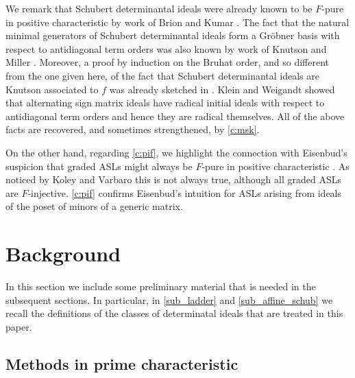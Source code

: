 \documentclass[12pt]{amsart}
\theoremstyle{definition}
\renewcommand{\(}{\left(}
\renewcommand{\)}{\right)}
\renewcommand{\!}[1]{{\color{red}\text{\Huge$\star$ }#1}}
\begin{document}
We remark that Schubert determinantal ideals %
were already known to be  %
$F$-pure in positive characteristic by work of Brion and Kumar  \cite{Brion_Kumar_Book}. The fact that the natural minimal generators of Schubert determinantal ideals form a Gr\"obner basis with respect  to antidiagonal term orders was also known  by work of Knutson and Miller  \cite{knutson2005grobner}. Moreover,  a proof by induction on the Bruhat order, and so different from the one given here, of the fact that  Schubert determinantal ideals are Knutson associated to $f$ was  already sketched  in \cite{knutson2009frobenius}. Klein and  Weigandt \cite{klein2021bumpless} showed that alternating sign matrix ideals have radical initial ideals with respect to antidiagonal term orders and hence they are radical themselves. 
All of the above facts are recovered, and sometimes strengthened, by \autoref{c:msk}. 

On the other hand, regarding \autoref{c:pif}, we highlight the connection with  Eisenbud's suspicion that graded ASLs might always be $F$-pure in positive characteristic \cite[p. 245]{eisenbud80}. As noticed by Koley and Varbaro \cite[Remark 5.2]{KoleyVarbaro} this is not always true, although  all graded ASLs are $F$-injective. \autoref{c:pif} confirms Eisenbud's intuition for ASLs arising from ideals of the poset of minors of a generic matrix. 


\section{Background}\label{SectionBackground}

In this section we include some preliminary material that is needed in the subsequent sections. In particular, in   \autoref{sub_ladder} and \autoref{sub_affine_schub} we recall the definitions of the classes of determinatal ideals that are treated in this paper. 

\subsection{Methods in prime characteristic}\label{SubSecPrimeChar} %
\end{document}
